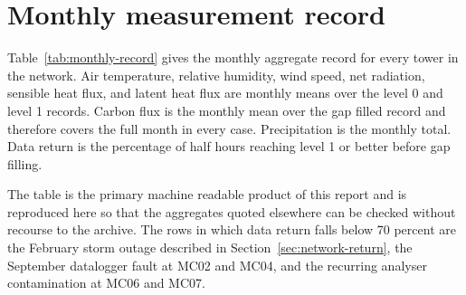 \section{Monthly measurement record}
\label{sec:measurement-table}

Table~\ref{tab:monthly-record} gives the monthly aggregate record for every
tower in the network. Air temperature, relative humidity, wind speed, net
radiation, sensible heat flux, and latent heat flux are monthly means over the
level 0 and level 1 records. Carbon flux is the monthly mean over the gap filled
record and therefore covers the full month in every case. Precipitation is the
monthly total. Data return is the percentage of half hours reaching level 1 or
better before gap filling.

The table is the primary machine readable product of this report and is
reproduced here so that the aggregates quoted elsewhere can be checked without
recourse to the archive. The rows in which data return falls below 70 percent
are the February storm outage described in Section~\ref{sec:network-return}, the
September datalogger fault at MC02 and MC04, and the recurring analyser
contamination at MC06 and MC07.

\begingroup
\small
\setlength{\tabcolsep}{4.5pt}

